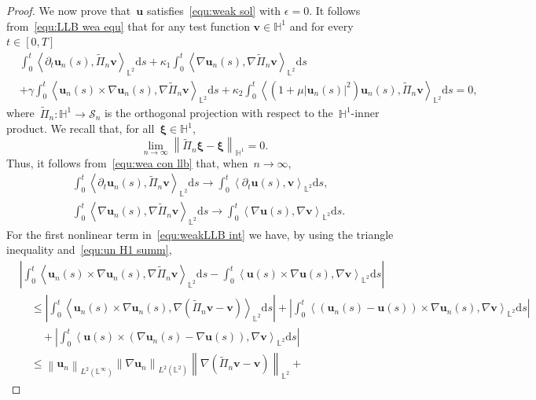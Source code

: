 \documentclass[11pt,reqno]{amsart}
\theoremstyle{definition}
\numberwithin{equation}{section}
\newcommand{\bff}{\boldsymbol}
\newcommand{\bb}{\mathbb}
\newcommand{\ds}{\mathrm{d}s}
\newcommand{\pa}{\partial}
\newcommand{\nn}{\nonumber}
\newcommand{\norm}[2]{\left\|{#1}\right\|_{#2}}
\newcommand{\inpro}[2]{\left\langle#1,#2\right\rangle}
\begin{document}
\begin{proof}
We now prove that~$\bff{u}$ satisfies~\eqref{equ:weak sol} with $\epsilon=0$.
	It follows from~\eqref{equ:LLB wea equ} that for any test function
	$\bff{v}\in \bb{H}^1$ and for every $t\in[0,T]$
	\begin{align}\label{equ:weakLLB int}
		&\int_0^t \inpro{\pa_t\bff{u}_n(s)}{\tilde\Pi_n \bff{v}}_{\bb{L}^2} \ds
		+\kappa_1\int_0^t \inpro{\nabla\bff{u}_n(s)}{\nabla\tilde\Pi_n \bff{v}}_{\bb{L}^2}\ds 
		\nn\\
		&
		+\gamma\int_0^t \inpro{\bff{u}_n(s)\times\nabla\bff{u}_n(s)}{\nabla \tilde\Pi_n \bff{v}}_{\bb{L}^2}\ds
		+\kappa_2\int_0^t \inpro{(1+\mu|\bff{u}_n(s)|^2)\bff{u}_n(s)}{\tilde\Pi_n \bff{v}}_{\bb{L}^2}\ds
		= 0,
	\end{align}
	where~$\tilde\Pi_n:\bb{H}^1\to \mathcal{S}_n$ is the orthogonal projection with respect to the~$\bb{H}^1$-inner product.
	We recall that, for all~$\bff{\xi}\in\bb{H}^1$,
	\[
	\lim_{n\to\infty}\norm{\tilde\Pi_n\bff{\xi}-\bff{\xi}}{\bb{H}^1} = 0.
	\]
	Thus, it follows from~\eqref{equ:wea con llb} 
	that, when~$n\to\infty$,
	\begin{align*}
		&\int_0^t \inpro{\pa_t\bff{u}_n(s)}{\tilde\Pi_n \bff{v}}_{\bb{L}^2} \ds
		\to
		\int_0^t \inpro{\pa_t\bff{u}(s)}{\bff{v}}_{\bb{L}^2} \ds,
		\\
		&\int_0^t \inpro{\nabla\bff{u}_n(s)}{\nabla\tilde\Pi_n \bff{v}}_{\bb{L}^2}\ds 
		\to
		\int_0^t \inpro{\nabla\bff{u}(s)}{\nabla\bff{v}}_{\bb{L}^2}\ds.
	\end{align*}
	For the first nonlinear term in~\eqref{equ:weakLLB int} we have, by using the
	triangle inequality and~\eqref{equ:un H1 summ},
	\begin{align*}
		&
		\left|
		\int_0^t \inpro{\bff{u}_n(s)\times\nabla\bff{u}_n(s)}{\nabla\tilde\Pi_n \bff{v}}_{\bb{L}^2}\ds
		-
		\int_0^t \inpro{\bff{u}(s)\times\nabla\bff{u}(s)}{\nabla\bff{v}}_{\bb{L}^2}\ds
		\right|
		\\
		&\quad\le
		\left|
		\int_0^t
		\inpro{\bff{u}_n(s)\times\nabla\bff{u}_n(s)}{\nabla(\tilde\Pi_n
			\bff{v}-\bff{v})}_{\bb{L}^2}\ds \right|
		+
		\left| \int_0^t \inpro{(\bff{u}_n(s)-\bff{u}(s))\times \nabla
			\bff{u}_n(s)}{\nabla\bff{v}}_{\bb{L}^2} \ds \right| 
		\\
		&\qquad
		+
		\left| \int_0^t \inpro{\bff{u}(s) \times (\nabla \bff{u}_n(s)-
			\nabla \bff{u}(s))}{\nabla\bff{v}}_{\bb{L}^2} \ds \right| 
		\\
		&\quad\le
		\norm{\bff{u}_n}{L^2(\bb{L}^\infty)}
		\norm{\nabla\bff{u}_n}{L^2(\bb{L}^2)}
		\norm{\nabla(\tilde\Pi_n\bff{v}-\bff{v})}{\bb{L}^2}
		+

\end{align*}
\end{proof}
\end{document}
